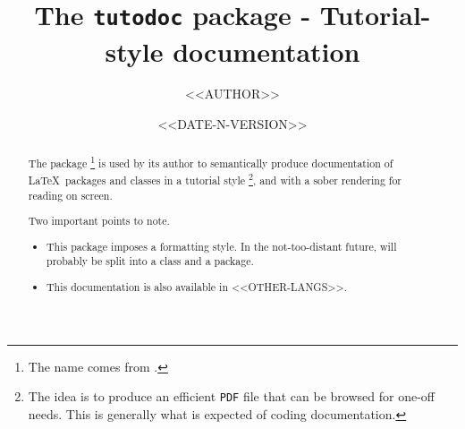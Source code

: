 \documentclass[10pt, a4paper]{article}
\begin{document}
\title{The \texttt{tutodoc} package - Tutorial-style documentation}
\author{<<AUTHOR>>}
\date{<<DATE-N-VERSION>>}

\maketitle

\begin{abstract}
    The  package
    \footnote{
        The name comes from .
    }
    is used by its author to semantically produce documentation of \LaTeX\ packages and classes in a tutorial style
    \footnote{
        The idea is to produce an efficient \texttt{PDF} file that can be browsed for one-off needs. This is generally what is expected of coding documentation.
    },
    and with a sober rendering for reading on screen.

    \medskip

    Two important points to note.
    \begin{itemize}
        \item This package imposes a formatting style. In the not-too-distant future,  will probably be split into a class and a package.

        \item This documentation is also available in <<OTHER-LANGS>>.
    \end{itemize}
\end{abstract}
\end{document}
